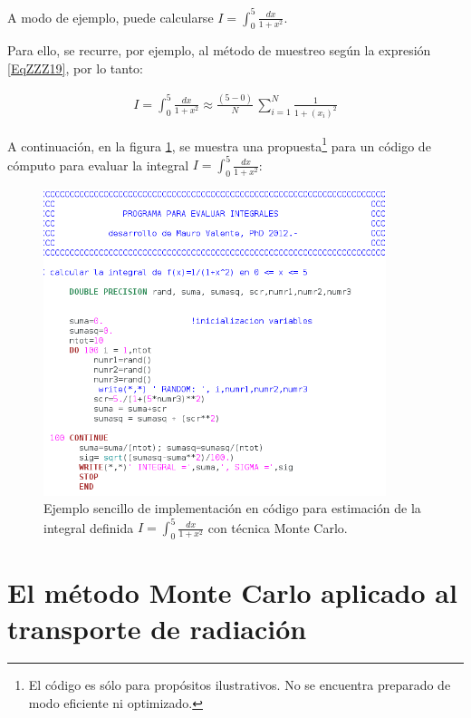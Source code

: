 A modo de ejemplo, puede calcularse $ I = \int _{0} ^{5} \frac{dx}{1 + x^{2}}$.
%

Para ello, se recurre, por ejemplo, al m\'etodo de muestreo seg\'un la expresi\'on \ref{EqZZZ19}, por lo tanto:

\begin{eqnarray}
 	I = \int _{0} ^{5} \frac{dx}{1 + x^{2}} \approx \frac{(5 - 0)}{N} \, \sum _{i=1} ^{N} \frac{1}{ 1 + (x_{i})^{2}}
 \label{EqZZZ21} 
\end{eqnarray}

A continuaci\'on, en la figura \ref{Fig7_2}, se muestra una propuesta\footnote{El c\'odigo es s\'olo para prop\'ositos ilustrativos. No se encuentra preparado de modo 
eficiente ni optimizado.} para un c\'odigo de c\'omputo para evaluar la integral $ I = \int _{0} ^{5} \frac{dx}{1 + x^{2}}$:


\begin{center}
\begin{figure} [!h]

\centering
\includegraphics[width=10cm]{Figuras/Fig7_2.png}
   
\caption{Ejemplo sencillo de implementaci\'on en c\'odigo para estimaci\'on de la integral definida $ I = \int _{0} ^{5} \frac{dx}{1 + x^{2}}$ 
con t\'ecnica Monte Carlo.}
\label{Fig7_2}

\end{figure}
\end{center}

\section{El m\'etodo Monte Carlo aplicado al transporte de radiaci\'on}
\label{CapVII_9}

